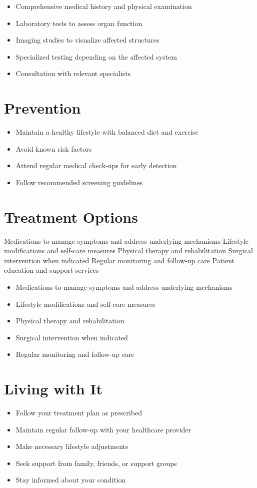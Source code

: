 \begin{itemize}[noitemsep]
  \item Comprehensive medical history and physical examination
  \item Laboratory tests to assess organ function
  \item Imaging studies to visualize affected structures
  \item Specialized testing depending on the affected system
  \item Consultation with relevant specialists
\end{itemize}
\section{Prevention}
\begin{itemize}[noitemsep]
  \item Maintain a healthy lifestyle with balanced diet and exercise
  \item Avoid known risk factors
  \item Attend regular medical check-ups for early detection
  \item Follow recommended screening guidelines
\end{itemize}
\section{Treatment Options}
Medications to manage symptoms and address underlying mechanisms Lifestyle modifications and self-care measures Physical therapy and rehabilitation Surgical intervention when indicated Regular monitoring and follow-up care Patient education and support services

\begin{itemize}[noitemsep]
  \item Medications to manage symptoms and address underlying mechanisms
  \item Lifestyle modifications and self-care measures
  \item Physical therapy and rehabilitation
  \item Surgical intervention when indicated
  \item Regular monitoring and follow-up care
\end{itemize}
\section{Living with It}
\begin{itemize}[noitemsep]
  \item Follow your treatment plan as prescribed
  \item Maintain regular follow-up with your healthcare provider
  \item Make necessary lifestyle adjustments
  \item Seek support from family, friends, or support groups
  \item Stay informed about your condition
\end{itemize}
